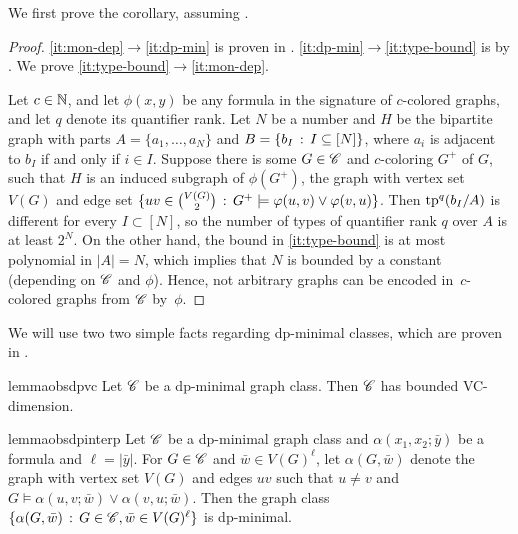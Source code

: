 We first prove the corollary, assuming .
\begin{proof}
    \eqref{it:mon-dep}$\rightarrow$\eqref{it:dp-min} is proven in .    
    \eqref{it:dp-min}$\rightarrow$\eqref{it:type-bound} is by .
    We prove \eqref{it:type-bound}$\rightarrow$\eqref{it:mon-dep}.

    Let $c\in\mathbb N$, and let $\phi(x,y)$ be any formula in the signature of $c$-colored graphs, and let $q$ denote its quantifier rank. Let $N$ be a number and $H$ be the bipartite graph with parts $A=\{a_1,\ldots,a_N\}$ and $B=\{b_I \,:\, I\subseteq [N] \}$, where $a_i$ is adjacent to $b_I$ if and only if $i\in I$. Suppose there is some $G\in\mathscr C$ and $c$-coloring $G^+$ of $G$, such that $H$ is an induced subgraph of $\phi(G^+)$, the graph with vertex set $V(G)$ and edge set $\{uv\in \binom{V(G)}{2} \,:\, G^+\models \varphi(u,v)\lor \varphi(v,u) \}$. Then $\textnormal{tp}^q(b_I/A)$ is different for every $I\subset [N]$,
so the number of types of quantifier rank $q$ over $A$ is at least $2^N$.
On the other hand, the bound in \eqref{it:type-bound} is at most polynomial in $|A|=N$, which implies that $N$ is bounded by a constant (depending on $\mathscr C$ and $\phi$).
Hence, not arbitrary graphs can be encoded in~$c$-colored graphs from $\mathscr C$ by~$\phi$. 
\end{proof}


We will use two two simple facts regarding dp-minimal classes, which are proven in .




\begin{restatable}{lemma}{obsdpvc}\label{obs:dp-vc}
    Let $\mathscr C$ be a dp-minimal graph class. Then $\mathscr C$ has bounded VC-dimension.
\end{restatable}
\begin{restatable}{lemma}{obsdpinterp}\label{obs:dp-interp}
    Let $\mathscr C$ be a dp-minimal graph class and $\alpha(x_1,x_2;\bar y)$ be a formula and $\ell=|\bar y|$.
    For $G\in\mathscr C$ and $\bar w\in V(G)^{\ell}$, let $\alpha(G,\bar w)$ denote the graph with vertex set $V(G)$ and edges $uv$ such that $u\neq v$ and $G\models\alpha(u,v;\bar w)\lor \alpha(v,u;\bar w)$.
    Then the graph class $\{\alpha(G,\bar w) \,:\, G\in\mathscr C, \bar w\in V(G)^{\ell} \}$ is dp-minimal.
\end{restatable}


